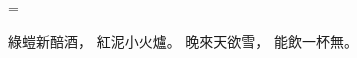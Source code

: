 \documentclass{ltjtarticle}
\begin{document}
\parindent=0pt\obeylines\lineskip=\zw{}\zw

綠螘新醅酒，
紅泥小火爐。
晚來天欲雪，
能飲一杯無。
\end{document}
